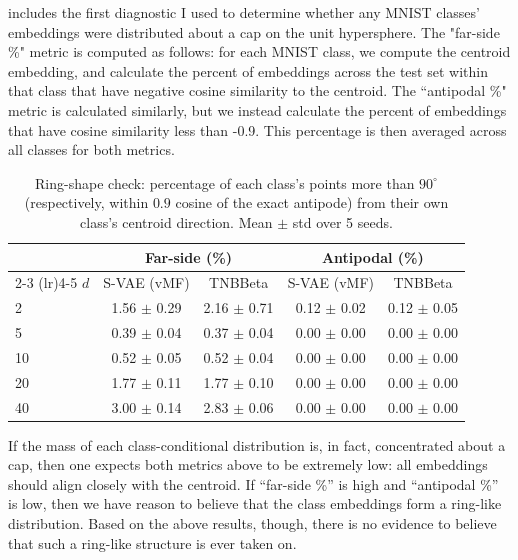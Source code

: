  includes the first diagnostic I used to determine whether any MNIST classes'
embeddings were distributed about a cap on the unit hypersphere. The "far-side \%" metric is computed
as follows: for each MNIST class, we compute the centroid embedding, and calculate the percent of
embeddings across the test set within that class that have negative cosine similarity to the
centroid. The ``antipodal \%" metric is calculated similarly, but we instead calculate the percent of
embeddings that have cosine similarity less than -0.9. This percentage is then averaged across all classes
for both metrics.
\begin{table}[H]
\centering
\begin{tabular}{lcccc}
\toprule
& \multicolumn{2}{c}{Far-side (\%)} & \multicolumn{2}{c}{Antipodal (\%)} \\
\cmidrule(lr){2-3} \cmidrule(lr){4-5}
$d$ & S-VAE (vMF) & TNBBeta & S-VAE (vMF) & TNBBeta \\
\midrule
2  & 1.56 $\pm$ 0.29 & 2.16 $\pm$ 0.71 & 0.12 $\pm$ 0.02 & 0.12 $\pm$ 0.05 \\
5  & 0.39 $\pm$ 0.04 & 0.37 $\pm$ 0.04 & 0.00 $\pm$ 0.00 & 0.00 $\pm$ 0.00 \\
10 & 0.52 $\pm$ 0.05 & 0.52 $\pm$ 0.04 & 0.00 $\pm$ 0.00 & 0.00 $\pm$ 0.00 \\
20 & 1.77 $\pm$ 0.11 & 1.77 $\pm$ 0.10 & 0.00 $\pm$ 0.00 & 0.00 $\pm$ 0.00 \\
40 & 3.00 $\pm$ 0.14 & 2.83 $\pm$ 0.06 & 0.00 $\pm$ 0.00 & 0.00 $\pm$ 0.00 \\
\bottomrule
\end{tabular}
\caption{Ring-shape check: percentage of each class's points more than
$90^\circ$ (respectively, within $0.9$ cosine of the exact antipode) from their own
class's centroid direction. Mean $\pm$ std over 5 seeds.}
\label{tab:ring-exclusion}
\end{table}
If the mass of each class-conditional distribution is, in fact, concentrated about a cap, then
one expects both metrics above to be extremely low: all embeddings should align closely with
the centroid. If ``far-side \%'' is high and ``antipodal \%'' is low, then we have reason to
believe that the class embeddings form a ring-like distribution. Based on the above results, though,
there is no evidence to believe that such a ring-like structure is ever taken on.